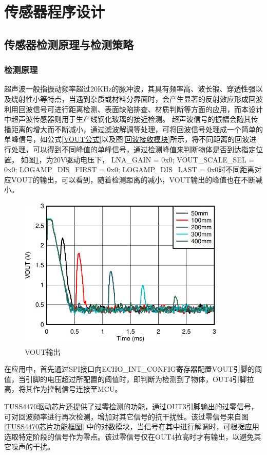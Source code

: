     \newpage
	\section{传感器程序设计}
    \subsection{传感器检测原理与检测策略}
    

    
    \subsubsection{检测原理}
    超声波一般指振动频率超过20KHz的脉冲波，其具有频率高、波长锻、穿透性强以及绕射性小等特点，当遇到杂质或材料分界面时，会产生显著的反射效应形成回波利用回波信号可进行距离检测、表面缺陷排查、材质判断等方面的应用，而本设计中超声波传感器则用于生产线钢化玻璃的接近检测。
    超声波信号的振幅会随其传播距离的增大而不断减小，通过滤波解调等处理，可将回波信号处理成一个简单的单峰信号，如公式\ref{VOUT公式}以及图\ref{回波接收模块}所示，将不同距离的回波进行处理，可以得到不同峰值的单峰信号，通过检测峰值来判断物体是否到达指定位置。
    如图\ref{VOUT输出}，为20V驱动电压下， LNA\_GAIN = 0x0; VOUT\_SCALE\_SEL = 0x0; 
LOGAMP\_DIS\_FIRST = 0x0; LOGAMP\_DIS\_LAST = 0x0时不同距离对应VOUT的输出，可以看到，随着检测距离的减小，VOUT输出的峰值也在不断减小。\par
    \begin{figure}[H]
        \centering
        \includegraphics[width=10cm]{figure/VOUT image.png}
        \caption{VOUT输出}
        \label{VOUT输出}
    \end{figure}
    在应用中，首先通过SPI接口向ECHO\_INT\_CONFIG寄存器配置VOUT引脚的阈值，当引脚的电压超过所配置的阈值时，即判断为检测到了物体，OUT4引脚拉高，将其作为控制信号连接至MCU。\par
    TUSS4470驱动芯片还提供了过零检测的功能，通过OUT3引脚输出的过零信号，可对回波频率进行再次检测，增加对其它信号的抗干扰性。该过零信号来自图\ref{TUSS4470芯片功能框图}
    中的对数模块，当信号在其中进行解调时，可根据应用选取特定阶段的信号作为零点。该过零信号仅在OUT4拉高时才有输出，以避免其它噪声的干扰。
